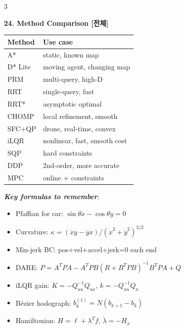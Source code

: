 \documentclass[8pt,a4paper,landscape]{extarticle}
\newcommand{\sect}[1]{\vspace{1pt}\colorbox{black!10}{\parbox{\linewidth}{\textbf{\footnotesize #1}}}\vspace{1pt}}
\newcommand{\sub}[1]{\textbf{\textit{#1}}}
\begin{document}
\begin{multicols*}{3}
\sect{24. Method Comparison \hfill {\scriptsize[전체]}}
\begin{tabular}{@{}p{1.4cm}p{2.6cm}@{}}
\toprule
Method & Use case \\
\midrule
A* & static, known map \\
D* Lite & moving agent, changing map \\
PRM & multi-query, high-D \\
RRT & single-query, fast \\
RRT* & asymptotic optimal \\
CHOMP & local refinement, smooth \\
SFC+QP & drone, real-time, convex \\
iLQR & nonlinear, fast, smooth cost \\
SQP & hard constraints \\
DDP & 2nd-order, more accurate \\
MPC & online + constraints \\
\bottomrule
\end{tabular}

\sub{Key formulas to remember}:
\begin{itemize}
\item Pfaffian for car: $\sin\theta\dot x-\cos\theta\dot y=0$
\item Curvature: $\kappa=(\dot x\ddot y-\dot y\ddot x)/(\dot x^2+\dot y^2)^{3/2}$
\item Min-jerk BC: pos+vel+accel+jerk=0 each end
\item DARE: $P=A^T PA-A^T PB(R+B^T PB)^{-1}B^T PA+Q$
\item iLQR gain: $K=-Q_{uu}^{-1}Q_{ux}$, $k=-Q_{uu}^{-1}Q_u$
\item Bézier hodograph: $b_k^{(1)}=N(b_{k+1}-b_k)$
\item Hamiltonian: $H=\ell+\lambda^T f$, $\dot\lambda=-H_x$
\end{itemize}

\end{multicols*}
\end{document}
